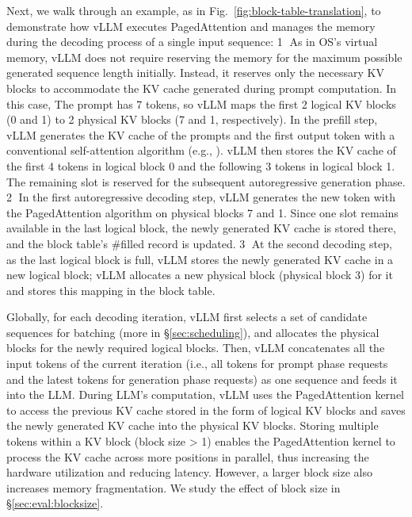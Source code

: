 Next, we walk through an example, as in Fig.~\ref{fig:block-table-translation}, to demonstrate how vLLM executes PagedAttention and manages the memory during the decoding process of a single input sequence: \textcircled{\small 1} As in OS's virtual memory, vLLM does not require reserving the memory for the maximum possible generated sequence length initially. Instead, it reserves only the necessary KV blocks to accommodate the KV cache generated during prompt computation. In this case, The prompt has 7 tokens, so vLLM maps the first 2 logical KV blocks (0 and 1) to 2 physical KV blocks (7 and 1, respectively). In the prefill step, vLLM generates the KV cache of the prompts and the first output token with a conventional self-attention algorithm (e.g., \cite{dao2022flashattention}). vLLM then stores the KV cache of the first 4 tokens in logical block 0 and the following 3 tokens in logical block 1. The remaining slot is reserved for the subsequent autoregressive generation phase. 
\textcircled{\small 2} In the first autoregressive decoding step, vLLM generates the new token with the PagedAttention algorithm on physical blocks 7 and 1. Since one slot remains available in the last logical block, the newly generated KV cache is stored there, and the block table's \#filled record is updated. \textcircled{\small 3} At the second decoding step, as the last logical block is full, vLLM stores the newly generated KV cache in a new logical block; vLLM allocates a new physical block (physical block 3) for it and stores this mapping in the block table.

Globally, for each decoding iteration, vLLM first selects a set of candidate sequences for batching (more in \S\ref{sec:scheduling}), and allocates the physical blocks for the newly required logical blocks. Then, vLLM concatenates all the input tokens of the current iteration (i.e., all tokens for prompt phase requests and the latest tokens for generation phase requests) as one sequence and feeds it into the LLM. During LLM's computation, vLLM uses the PagedAttention kernel to access the previous KV cache stored in the form of logical KV blocks and saves the newly generated KV cache into the physical KV blocks. Storing multiple tokens within a KV block (block size > 1) enables the PagedAttention kernel to process the KV cache across more positions in parallel, thus increasing the hardware utilization and reducing latency. However, a larger block size also increases memory fragmentation. We study the effect of block size in \S\ref{sec:eval:blocksize}.

